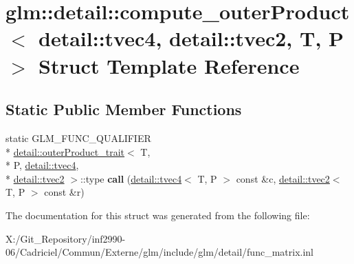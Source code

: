 \hypertarget{structglm_1_1detail_1_1compute__outer_product_3_01detail_1_1tvec4_00_01detail_1_1tvec2_00_01_t_00_01_p_01_4}{\section{glm\-:\-:detail\-:\-:compute\-\_\-outer\-Product$<$ detail\-:\-:tvec4, detail\-:\-:tvec2, T, P $>$ Struct Template Reference}
\label{structglm_1_1detail_1_1compute__outer_product_3_01detail_1_1tvec4_00_01detail_1_1tvec2_00_01_t_00_01_p_01_4}
}
\subsection*{Static Public Member Functions}
\begin{DoxyCompactItemize}
\item 
\hypertarget{structglm_1_1detail_1_1compute__outer_product_3_01detail_1_1tvec4_00_01detail_1_1tvec2_00_01_t_00_01_p_01_4_a7ae9fc8b98d19655b6cb21fc1ff997b2}{static G\-L\-M\-\_\-\-F\-U\-N\-C\-\_\-\-Q\-U\-A\-L\-I\-F\-I\-E\-R \\*
\hyperlink{structglm_1_1detail_1_1outer_product__trait}{detail\-::outer\-Product\-\_\-trait}$<$ T, \\*
P, \hyperlink{structglm_1_1detail_1_1tvec4}{detail\-::tvec4}, \\*
\hyperlink{structglm_1_1detail_1_1tvec2}{detail\-::tvec2} $>$\-::type {\bfseries call} (\hyperlink{structglm_1_1detail_1_1tvec4}{detail\-::tvec4}$<$ T, P $>$ const \&c, \hyperlink{structglm_1_1detail_1_1tvec2}{detail\-::tvec2}$<$ T, P $>$ const \&r)}\label{structglm_1_1detail_1_1compute__outer_product_3_01detail_1_1tvec4_00_01detail_1_1tvec2_00_01_t_00_01_p_01_4_a7ae9fc8b98d19655b6cb21fc1ff997b2}

\end{DoxyCompactItemize}


The documentation for this struct was generated from the following file\-:\begin{DoxyCompactItemize}
\item 
X\-:/\-Git\-\_\-\-Repository/inf2990-\/06/\-Cadriciel/\-Commun/\-Externe/glm/include/glm/detail/func\-\_\-matrix.\-inl\end{DoxyCompactItemize}
